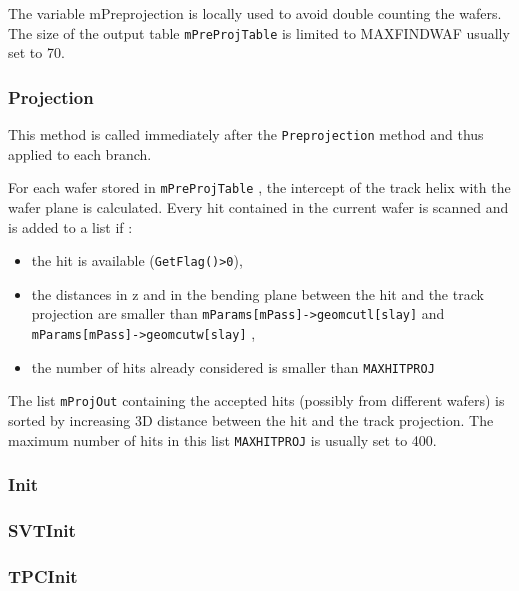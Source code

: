\documentclass[twoside]{article}
\begin{document}
The variable mPreprojection is locally used to avoid double counting
the wafers. The size of the output table \verb+mPreProjTable+ is
limited to MAXFINDWAF usually set to 70.

\subsubsection{Projection}
\label{sec:Projectionq}
This method is called immediately after the \verb+Preprojection+
method and thus applied to each branch.

For each wafer stored in \verb+mPreProjTable+
, the intercept of the track helix with the wafer plane
is calculated. Every hit contained in the current wafer is scanned and
is added to a list if :
\begin{itemize}
\item the hit is available (\verb+GetFlag()>0+),
\item the distances in z and in the bending plane between the hit and 
the track projection are smaller than \verb+mParams[mPass]->geomcutl[slay]+ and 
\verb+mParams[mPass]->geomcutw[slay]+ ,
\item the number of hits already considered is smaller than \verb+MAXHITPROJ+
\end{itemize}

The list \verb+mProjOut+ 
containing the accepted hits (possibly from different wafers) 
is sorted by increasing 3D distance between the hit and the track projection.
The maximum number of hits in this list \verb+MAXHITPROJ+ is usually set to 400. 

\subsubsection{Init}
\label{sec:Initq}

\subsubsection{SVTInit}
\label{sec:SVTInitq}

\subsubsection{TPCInit}
\label{sec:TPCInitq}
\end{document}
